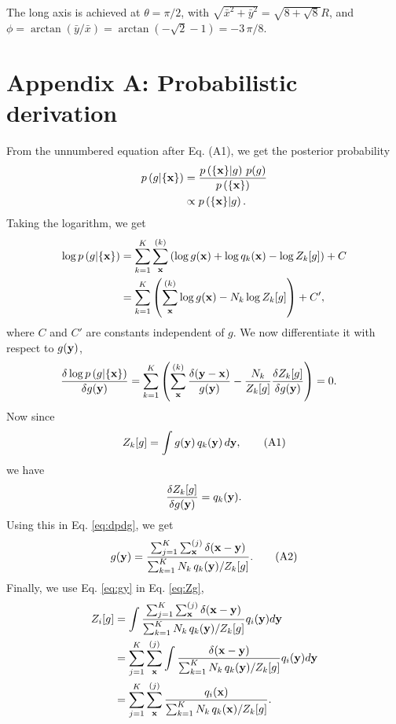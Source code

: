 \documentclass[aip,jcp,preprint,notitlepage, superscriptaddress]{revtex4-1}
\begin{document}
The long axis is achieved at $\theta = \pi/2$,
with
$\sqrt{ {\bar x}^2 + {\bar y}^2 } = \sqrt{ 8 + \sqrt 8 } R$,
and
$\phi = \arctan(\bar y/\bar x) = \arctan \left(-\sqrt 2 - 1\right) = -3 \, \pi/8$.




\section{Appendix A: Probabilistic derivation}



From the unnumbered equation after Eq. (A1),
we get the posterior probability
\begin{align*}
p\left( g | \{ \mathbf{x} \} \right)
&=
\frac{
  p\left( \{ \mathbf{x} \} | g \right) \, p(g)
}
{
  p\left( \{ \mathbf{x} \} \right)
}
\\
&\propto
p\left( \{ \mathbf{x} \} | g \right).
\end{align*}
%
Taking the logarithm, we get
%
\begin{align*}
\log p\left( g | \{ \mathbf{x} \} \right)
&=
\sum_{k = 1}^K
  \sum_{\mathbf{x}}^{(k)}
    \left(
      \log g(\mathbf{x}) + \log q_k(\mathbf{x}) - \log Z_k[g]
    \right)
+ C
\\
&=
\sum_{k = 1}^K
\left(
  \sum_{\mathbf{x}}^{(k)}
  \log g(\mathbf{x})
- N_k \log Z_k[g]
\right) + C',
\end{align*}
%
where $C$ and $C'$
are constants independent of $g$.
%
We now differentiate it with respect to $g(\mathbf{y})$,
%
\begin{align}
\frac{
  \delta \log p\left( g | \{ \mathbf{x} \} \right)
}
{
  \delta g(\mathbf{y})
}
&=
\sum_{k = 1}^K
\left(
  \sum_{\mathbf{x}}^{(k)}
  \frac{ \delta( \mathbf{y} - \mathbf{x} ) }
       { g(\mathbf{y}) }
  -
  \frac {N_k} { Z_k[g] }
  \frac{ \delta Z_k[g] } { \delta g(\mathbf{y}) }
\right)
= 0.
\label{eq:dpdg}
\end{align}
%
Now since
\begin{equation}
Z_k[g]
=
\int g(\mathbf{y}) \, q_k(\mathbf{y}) \, d\mathbf{y},
\tag{A1}
\label{eq:Zg}
\end{equation}
we have
\begin{equation*}
\frac{ \delta Z_k[g] } { \delta g(\mathbf{y}) }
= q_k(\mathbf{y}).
\end{equation*}
%
Using this in Eq. \eqref{eq:dpdg},
we get
\begin{equation}
g(\mathbf{y})
=
\frac{
  \sum_{j = 1}^K \sum_{\mathbf{x}}^{(j)} \delta(\mathbf{x} - \mathbf{y})
}
{
  \sum_{k = 1}^K N_k \, q_k(\mathbf{y}) / Z_k[g]
}.
\tag{A2}
\label{eq:gy}
\end{equation}
%
Finally,
we use Eq. \eqref{eq:gy} in Eq. \eqref{eq:Zg},
%
\begin{align}
Z_i[g]
&=
\int
\frac{
  \sum_{j = 1}^K \sum_{\mathbf{x}}^{(j)} \delta(\mathbf{x} - \mathbf{y})
}
{
  \sum_{k = 1}^K N_k \, q_k(\mathbf{y}) / Z_k[g]
}
q_i(\mathbf{y}) d\mathbf{y}
\notag \\
&=
\sum_{j = 1}^K \sum_{\mathbf{x}}^{(j)}
\int
\frac{
  \delta(\mathbf{x} - \mathbf{y})
}
{
  \sum_{k = 1}^K N_k \, q_k(\mathbf{y}) / Z_k[g]
}
q_i(\mathbf{y}) d\mathbf{y}
\notag \\
&=
\sum_{j = 1}^K \sum_{\mathbf{x}}^{(j)}
\frac{
  q_i(\mathbf{x})
}
{
  \sum_{k = 1}^K N_k \, q_k(\mathbf{x}) / Z_k[g]
}.
\end{align}
\end{document}

